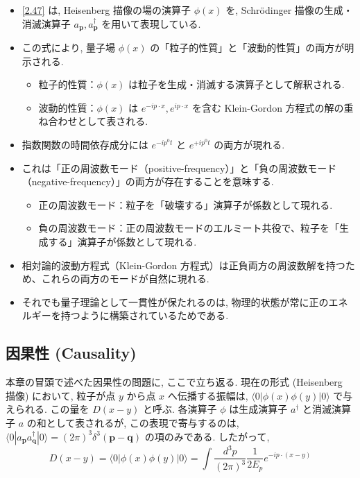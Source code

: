 \documentclass[a4paper,12pt]{article}
\begin{document}
\begin{itemize}
  \item \eqref{2.47} は, Heisenberg 描像の場の演算子 $\phi(x)$ を, Schrödinger 描像の生成・消滅演算子 $a_{\mathbf{p}}, a_{\mathbf{p}}^\dagger$ を用いて表現している.
  
  \item この式により, 量子場 $\phi(x)$ の「粒子的性質」と「波動的性質」の両方が明示される.
  \begin{itemize}
    \item 粒子的性質：$\phi(x)$ は粒子を生成・消滅する演算子として解釈される.
    \item 波動的性質：$\phi(x)$ は $e^{-ip \cdot x}, e^{ip \cdot x}$ を含む Klein-Gordon 方程式の解の重ね合わせとして表される.
  \end{itemize}

  \item 指数関数の時間依存成分には $e^{-ip^0 t}$ と $e^{+ip^0 t}$ の両方が現れる.

  \item これは「正の周波数モード（positive-frequency）」と「負の周波数モード（negative-frequency）」の両方が存在することを意味する.
  \begin{itemize}
    \item 正の周波数モード：粒子を「破壊する」演算子が係数として現れる.
    \item 負の周波数モード：正の周波数モードのエルミート共役で、粒子を「生成する」演算子が係数として現れる.
  \end{itemize}

  \item 相対論的波動方程式（Klein-Gordon 方程式）は正負両方の周波数解を持つため、これらの両方のモードが自然に現れる.

  \item それでも量子理論として一貫性が保たれるのは, 物理的状態が常に正のエネルギーを持つように構築されているためである.
\end{itemize}

\subsection*{因果性 (Causality)}
本章の冒頭で述べた因果性の問題に, ここで立ち返る. 現在の形式 (Heisenberg 描像) において, 粒子が点 $y$ から点 $x$ へ伝播する振幅は, $\langle 0 | \phi(x) \phi(y) | 0 \rangle$ で与えられる. この量を $D(x - y)$ と呼ぶ. 各演算子 $\phi$ は生成演算子 $a^\dagger$ と消滅演算子 $a$ の和として表されるが, この表現で寄与するのは, $\langle 0 | a_{\mathbf{p}} a^\dagger_{\mathbf{q}} | 0 \rangle = (2\pi)^3 \delta^3(\mathbf{p} - \mathbf{q})$ の項のみである. したがって,
\begin{equation*}
D(x - y) = \langle 0 | \phi(x) \phi(y) | 0 \rangle = \int \frac{d^3 p}{(2\pi)^3} \frac{1}{2E_p} e^{-ip \cdot (x - y)} \label{2.50}\tag{2.50}
\end{equation*}
\end{document}
